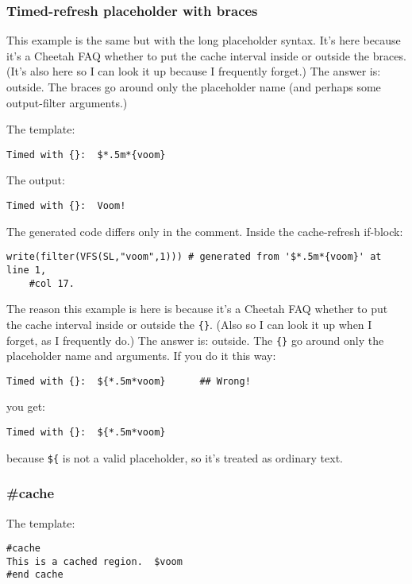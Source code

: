 \subsubsection{Timed-refresh placeholder with braces}
\label{output.cache.timed.braces}

This example is the same but with the long placeholder syntax.  It's here 
because it's a Cheetah FAQ whether to put the cache interval inside or outside
the braces.  (It's also here so I can look it up because I frequently forget.)
The answer is: outside.  The braces go around only the placeholder name (and
perhaps some output-filter arguments.)

The template:
\begin{verbatim}
Timed with {}:  $*.5m*{voom}
\end{verbatim}

The output:
\begin{verbatim}
Timed with {}:  Voom!
\end{verbatim}

The generated code differs only in the comment.  Inside the cache-refresh
if-block:
\begin{verbatim}
write(filter(VFS(SL,"voom",1))) # generated from '$*.5m*{voom}' at line 1, 
    #col 17.
\end{verbatim}

The reason this example is here is because it's a Cheetah FAQ whether to
put the cache interval inside or outside the \verb+{}+.  (Also so I can look
it up when I forget, as I frequently do.)  The answer is: outside.  The
\verb+{}+ go around only the placeholder name and arguments.  If you do it
this way:
\begin{verbatim}
Timed with {}:  ${*.5m*voom}      ## Wrong!
\end{verbatim}
you get:
\begin{verbatim}
Timed with {}:  ${*.5m*voom}
\end{verbatim}
because \verb+${+ is not a valid placeholder, so it's treated as ordinary text.

\subsubsection{\#cache}
\label{output.cache.directive}

The template:
\begin{verbatim}
#cache
This is a cached region.  $voom
#end cache
\end{verbatim}


